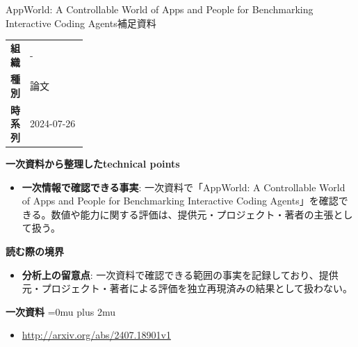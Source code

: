 \begin{technicalnote}{AppWorld: A Controllable World of Apps and People for Benchmarking Interactive Coding Agents}{補足資料}
\begingroup
\begin{tabularx}{\linewidth}{@{}>{\bfseries}p{0.22\linewidth}X@{}}
組織 & - \\
種別 & 論文 \\
時系列 & 2024-07-26 \\
\end{tabularx}
\smallskip
{\bfseries 一次資料から整理したtechnical points}
\begin{itemize}[leftmargin=1.5em,itemsep=0.35em]
\item \textbf{一次情報で確認できる事実}: 一次資料で「AppWorld: A Controllable World of Apps and People for Benchmarking Interactive Coding Agents」を確認できる。数値や能力に関する評価は、提供元・プロジェクト・著者の主張として扱う。
\end{itemize}
\begin{minipage}{\linewidth}
{\bfseries 読む際の境界}
\begin{itemize}[leftmargin=1.5em,itemsep=0.35em]
\item \textbf{分析上の留意点}: 一次資料で確認できる範囲の事実を記録しており、提供元・プロジェクト・著者による評価を独立再現済みの結果として扱わない。
\end{itemize}
\begin{samepage}
{\bfseries 一次資料}
\begingroup\sloppy
\Urlmuskip=0mu plus 2mu\relax
\begin{itemize}[leftmargin=1.5em,itemsep=0.25em]
\item {\scriptsize\url{http://arxiv.org/abs/2407.18901v1}}
\end{itemize}
\endgroup
\end{samepage}
\end{minipage}
\endgroup
\end{technicalnote}
\medskip

